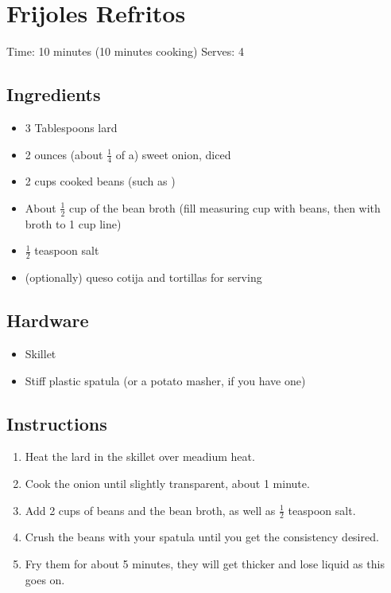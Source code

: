 \section{Frijoles Refritos}
\label{frijolesRefritos}
\setcounter{secnumdepth}{0}
Time: 10 minutes (10 minutes cooking)
Serves: 4

\begin{multicols}{2}
\subsection*{Ingredients}
\begin{itemize}
    \item 3 Tablespoons lard
    \item 2 ounces (about \( \frac{1}{4} \) of a) sweet onion, diced
    \item 2 cups cooked beans (such as )
    \item About \( \frac{1}{2} \) cup of the bean broth (fill measuring cup with beans, then with broth to 1 cup line)
    \item \( \frac{1}{2} \) teaspoon salt
    \item (optionally) queso cotija and tortillas for serving
\end{itemize}

\subsection*{Hardware}
\begin{itemize}
    \item Skillet
    \item Stiff plastic spatula (or a potato masher, if you have one)
\end{itemize}
\clearpage

\subsection*{Instructions}
\begin{enumerate}
    \item Heat the lard in the skillet over meadium heat.
    \item Cook the onion until slightly transparent, about 1 minute.
    \item Add 2 cups of beans and the bean broth, as well as \( \frac{1}{2} \) teaspoon salt.
    \item Crush the beans with your spatula until you get the consistency desired.
    \item Fry them for about 5 minutes, they will get thicker and lose liquid as this goes on.
\end{enumerate}


\end{multicols}
